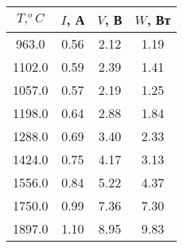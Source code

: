 \begin{tabular}{cccc}
\toprule
$T, ^oC$ & $I$, А & $V$, В & $W$, Вт \\
\midrule
963.0 & 0.56 & 2.12 & 1.19 \\
1102.0 & 0.59 & 2.39 & 1.41 \\
1057.0 & 0.57 & 2.19 & 1.25 \\
1198.0 & 0.64 & 2.88 & 1.84 \\
1288.0 & 0.69 & 3.40 & 2.33 \\
1424.0 & 0.75 & 4.17 & 3.13 \\
1556.0 & 0.84 & 5.22 & 4.37 \\
1750.0 & 0.99 & 7.36 & 7.30 \\
1897.0 & 1.10 & 8.95 & 9.83 \\
\bottomrule
\end{tabular}
